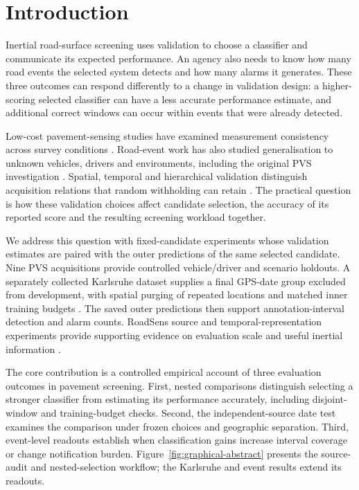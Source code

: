 \section{Introduction}
Inertial road-surface screening uses validation to choose a classifier and communicate its expected performance. An agency also needs to know how many road events the selected system detects and how many alarms it generates. These three outcomes can respond differently to a change in validation design: a higher-scoring selected classifier can have a less accurate performance estimate, and additional correct windows can occur within events that were already detected.

Low-cost pavement-sensing studies have examined measurement consistency across survey conditions \citep{sandamal2022,yu2023}. Road-event work has also studied generalisation to unknown vehicles, drivers and environments, including the original PVS investigation \citep{pvspaper}. Spatial, temporal and hierarchical validation distinguish acquisition relations that random withholding can retain \citep{roberts,ploton}. The practical question is how these validation choices affect candidate selection, the accuracy of its reported score and the resulting screening workload together.

We address this question with fixed-candidate experiments whose validation estimates are paired with the outer predictions of the same selected candidate. Nine PVS acquisitions provide controlled vehicle/driver and scenario holdouts. A separately collected Karlsruhe dataset supplies a final GPS-date group excluded from development, with spatial purging of repeated locations and matched inner training budgets \citep{pvsdata,kitpaper,kitdata}. The saved outer predictions then support annotation-interval detection and alarm counts. RoadSens source and temporal-representation experiments provide supporting evidence on evaluation scale and useful inertial information \citep{roadsens,roadsensdata}.

The core contribution is a controlled empirical account of three evaluation outcomes in pavement screening. First, nested comparisons distinguish selecting a stronger classifier from estimating its performance accurately, including disjoint-window and training-budget checks. Second, the independent-source date test examines the comparison under frozen choices and geographic separation. Third, event-level readouts establish when classification gains increase interval coverage or change notification burden. Figure~\ref{fig:graphical-abstract} presents the source-audit and nested-selection workflow; the Karlsruhe and event results extend its readouts.

